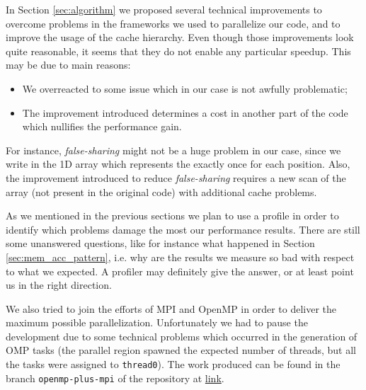 \documentclass{article}
\begin{document}
In Section \ref{sec:algorithm} we proposed several technical improvements to
overcome problems in the frameworks we used to parallelize our code, and
to improve the usage of the cache hierarchy. Even though those improvements
look quite reasonable, it seems that they do not enable any particular speedup.
This may be due to main reasons:
\begin{itemize}
    \item We overreacted to some issue which in our case is not awfully
    problematic;
    \item The improvement introduced determines a cost in another part of the
    code which nullifies the performance gain.
\end{itemize}
For instance, \emph{false-sharing} might not be a huge problem in our case,
since we write in the 1D array which represents the \kdtree{} exactly once for
each position. Also, the improvement introduced to reduce \emph{false-sharing}
requires a new scan of the array (not present in the original code) with
additional cache problems.

As we mentioned in the previous sections we plan to use a profile in order to
identify which problems damage the most our performance results. There are still
some unanswered questions, like for instance what happened in Section
\ref{sec:mem_acc_pattern}, i.e. why are the results we measure so bad with
respect to what we expected. A profiler may definitely give the answer, or at
least point us in the right direction.

We also tried to join the efforts of MPI and OpenMP in order to deliver the
maximum possible parallelization. Unfortunately we had to pause the development
due to some technical problems which occurred in the generation of OMP tasks
(the parallel region spawned the expected number of threads, but all the tasks
were assigned to \texttt{thread0}). The work produced can be found in the branch
\texttt{openmp-plus-mpi} of the repository at
\href{https://github.com/fAndreuzzi/parallel-kd-tree/tree/openmp-plus-mpi}{link}.


\end{document}
